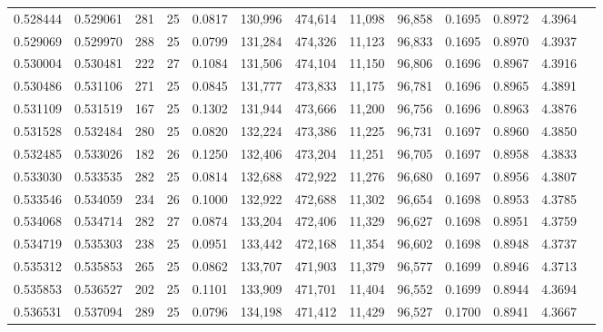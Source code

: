 \begin{tabular}{rrrrrrrrrrrrr}
0.528444 & 0.529061 &   281 &  25 &                                     0.0817 & 130,996 & 474,614 &  11,098 &  96,858 & 0.1695 & 0.8972 & 4.3964 \\
0.529069 & 0.529970 &   288 &  25 &                                     0.0799 & 131,284 & 474,326 &  11,123 &  96,833 & 0.1695 & 0.8970 & 4.3937 \\
0.530004 & 0.530481 &   222 &  27 &                                     0.1084 & 131,506 & 474,104 &  11,150 &  96,806 & 0.1696 & 0.8967 & 4.3916 \\
0.530486 & 0.531106 &   271 &  25 &                                     0.0845 & 131,777 & 473,833 &  11,175 &  96,781 & 0.1696 & 0.8965 & 4.3891 \\
0.531109 & 0.531519 &   167 &  25 &                                     0.1302 & 131,944 & 473,666 &  11,200 &  96,756 & 0.1696 & 0.8963 & 4.3876 \\
0.531528 & 0.532484 &   280 &  25 &                                     0.0820 & 132,224 & 473,386 &  11,225 &  96,731 & 0.1697 & 0.8960 & 4.3850 \\
0.532485 & 0.533026 &   182 &  26 &                                     0.1250 & 132,406 & 473,204 &  11,251 &  96,705 & 0.1697 & 0.8958 & 4.3833 \\
0.533030 & 0.533535 &   282 &  25 &                                     0.0814 & 132,688 & 472,922 &  11,276 &  96,680 & 0.1697 & 0.8956 & 4.3807 \\
0.533546 & 0.534059 &   234 &  26 &                                     0.1000 & 132,922 & 472,688 &  11,302 &  96,654 & 0.1698 & 0.8953 & 4.3785 \\
0.534068 & 0.534714 &   282 &  27 &                                     0.0874 & 133,204 & 472,406 &  11,329 &  96,627 & 0.1698 & 0.8951 & 4.3759 \\
0.534719 & 0.535303 &   238 &  25 &                                     0.0951 & 133,442 & 472,168 &  11,354 &  96,602 & 0.1698 & 0.8948 & 4.3737 \\
0.535312 & 0.535853 &   265 &  25 &                                     0.0862 & 133,707 & 471,903 &  11,379 &  96,577 & 0.1699 & 0.8946 & 4.3713 \\
0.535853 & 0.536527 &   202 &  25 &                                     0.1101 & 133,909 & 471,701 &  11,404 &  96,552 & 0.1699 & 0.8944 & 4.3694 \\
0.536531 & 0.537094 &   289 &  25 &                                     0.0796 & 134,198 & 471,412 &  11,429 &  96,527 & 0.1700 & 0.8941 & 4.3667 \\

\end{tabular}
